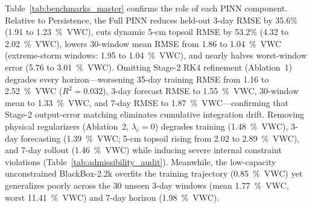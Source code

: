 \documentclass[pdflatex,sn-nature]{sn-jnl}%
\theoremstyle{thmstyleone}%
\theoremstyle{thmstyletwo}%
\theoremstyle{thmstylethree}%
\begin{document}
Table~\ref{tab:benchmarks_master} confirms the role of each PINN component. Relative to Persistence, the Full PINN reduces held-out 3-day RMSE by 35.6\% (1.91 to 1.23~\si{\%VWC}), cuts dynamic 5-\si{cm} topsoil RMSE by 53.2\% (4.32 to 2.02~\si{\%VWC}), lowers 30-window mean RMSE from 1.86 to 1.04~\si{\%VWC} (extreme-storm windows: 1.95 to 1.04~\si{\%VWC}), and nearly halves worst-window error (5.76 to 3.01~\si{\%VWC}). Omitting Stage-2 RK4 refinement (Ablation~1) degrades every horizon—worsening 35-day training RMSE from 1.16 to 2.52~\si{\%VWC} ($R^2 = 0.032$), 3-day forecast RMSE to 1.55~\si{\%VWC}, 30-window mean to 1.33~\si{\%VWC}, and 7-day RMSE to 1.87~\si{\%VWC}—confirming that Stage-2 output-error matching eliminates cumulative integration drift. Removing physical regularizers (Ablation~2, $\lambda_c = 0$) degrades training (1.48~\si{\%VWC}), 3-day forecasting (1.39~\si{\%VWC}; 5-\si{cm} topsoil rising from 2.02 to 2.89~\si{\%VWC}), and 7-day rollout (1.46~\si{\%VWC}) while inducing severe internal constraint violations (Table~\ref{tab:admissibility_audit}). Meanwhile, the low-capacity unconstrained BlackBox-2.2k overfits the training trajectory (0.85~\si{\%VWC}) yet generalizes poorly across the 30 unseen 3-day windows (mean 1.77~\si{\%VWC}, worst 11.41~\si{\%VWC}) and 7-day horizon (1.98~\si{\%VWC}).
\end{document}
